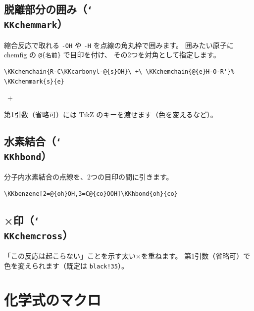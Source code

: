 \documentclass[paper=a4paper,fontsize=10pt]{jlreq}
\begin{document}
\subsection{脱離部分の囲み（\texttt{\char`\\KKchemmark}）}

縮合反応で取れる \verb|-OH| や \verb|-H| を点線の角丸枠で囲みます。
囲みたい原子に \textsf{chemfig} の \verb|@{名前}| で目印を付け、
その2つを対角として指定します。

\begin{verbatim}
\KKchemchain{R-C\KKcarbonyl-@{s}OH}\ +\ \KKchemchain{@{e}H-O-R'}%
\KKchemmark{s}{e}
\end{verbatim}

\begin{center}
\ +\ %
\end{center}

第1引数（省略可）には TikZ のキーを渡せます（色を変えるなど）。

\subsection{水素結合（\texttt{\char`\\KKhbond}）}

分子内水素結合の点線を、2つの目印の間に引きます。

\begin{verbatim}
\KKbenzene[2=@{oh}OH,3=C@{co}OOH]\KKhbond{oh}{co}
\end{verbatim}

\begin{center}
\KKbenzene[2=@{oh}OH,3=C@{co}OOH]
\end{center}

\subsection{×印（\texttt{\char`\\KKchemcross}）}

「この反応は起こらない」ことを示す太い×を重ねます。
第1引数（省略可）で色を変えられます（既定は \verb|black!35|）。

\begin{center}
\KKchemcross{\KKphenol}
\end{center}

\section{化学式のマクロ}
\end{document}
